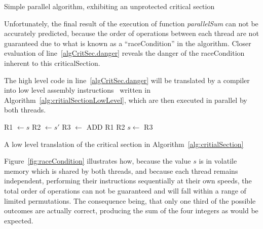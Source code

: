 \begin{algorithm}[ht]
	\DontPrintSemicolon


	\bigskip
\nl	{}

	\bigskip
\nl	{}
	\caption{Simple parallel algorithm, exhibiting an unprotected critical section \label{alg:critialSection}}
\end{algorithm}%

Unfortunately, the final result of the execution of function \textit{parallelSum} can not be accurately predicted, because the order of operations between each thread are not guaranteed due to what is known as a ``\gls{raceCondition}'' in the algorithm. Closer evaluation of line~\ref{algCritSec.danger} reveals the danger of the \gls{raceCondition} inherent to this \gls{criticalSection}.

The high level code in line~\ref{algCritSec.danger} will be translated by a compiler into low level assembly instructions~\cite[p.~25]{Lang17} written in Algorithm~\ref{alg:critialSectionLowLevel}, which are then executed in parallel by both threads.

\begin{algorithm}[ht]
	\DontPrintSemicolon
\nl	R1 $\leftarrow s$\;
\nl	R2 $\leftarrow s'$\;
\nl R3 $\leftarrow$ ADD R1 R2\;
\nl	$s \leftarrow$ R3\;
	\caption{A low level translation of the critical section in Algorithm~\ref{alg:critialSection} \label{alg:critialSectionLowLevel}}
\end{algorithm}

Figure~\ref{fig:raceCondition} illustrates how, because the value $s$ is in volatile memory which is shared by both threads, and because each thread remains independent, performing their instructions sequentially at their own speeds, the total order of operations can not be guaranteed and will fall within a range of limited permutations. The consequence being, that only one third of the possible outcomes are actually correct, producing the sum of the four integers as would be expected.

